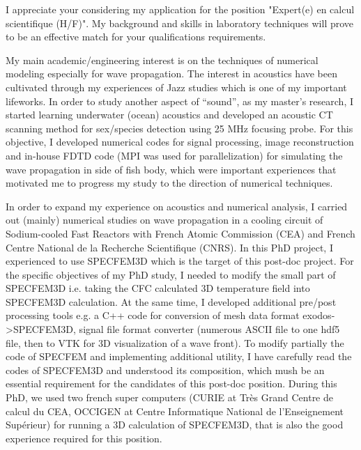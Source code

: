 \documentclass[9pt,a4paper]{moderncv}
\begin{document}
    \makelettertitle

  
    I appreciate your considering my application for the position "Expert(e) en calcul scientifique (H/F)". My background and skills in laboratory techniques will prove to be an effective match for your qualifications requirements.
    
    My main academic/engineering interest is on the techniques of numerical modeling especially for wave propagation. The interest in acoustics have been cultivated through my experiences of Jazz studies which is one of my important lifeworks.
    In order to study another aspect of “sound”,  as my master’s research, I started learning underwater (ocean) acoustics and developed an acoustic CT scanning method for sex/species detection using 25 MHz focusing probe. For this objective, I developed numerical codes for signal processing, image reconstruction and in-house FDTD code (MPI was used for parallelization) for simulating the wave propagation in side of fish body, which were important experiences that motivated me to progress my study to the direction of numerical techniques.
    
    In order to expand my experience on acoustics and numerical analysis, I carried out (mainly) numerical studies on wave propagation in a cooling circuit of Sodium-cooled Fast Reactors with French Atomic Commission (CEA) and French Centre National de la Recherche Scientifique (CNRS).
    In this PhD project, I experienced to use SPECFEM3D which is the target of this post-doc project. For the specific objectives of my PhD study, I needed to modify the small part of SPECFEM3D i.e. taking the CFC calculated 3D temperature field into SPECFEM3D calculation. 
    At the same time, I developed additional pre/post processing tools e.g. a C++ code for conversion of mesh data format exodos->SPECFEM3D, signal file format converter (numerous ASCII file to one hdf5 file, then to VTK for 3D visualization of a wave front).
    To modify partially the code of SPECFEM and implementing additional utility, I have carefully read the codes of SPECFEM3D and understood its composition, which mush be an essential requirement for the candidates of this post-doc position.
    During this PhD, we used two french super computers (CURIE at Très Grand Centre de calcul du CEA, OCCIGEN at Centre Informatique National de l’Enseignement Supérieur) for running a 3D calculation of SPECFEM3D, that is also the good experience required for this position.
    
\end{document}
